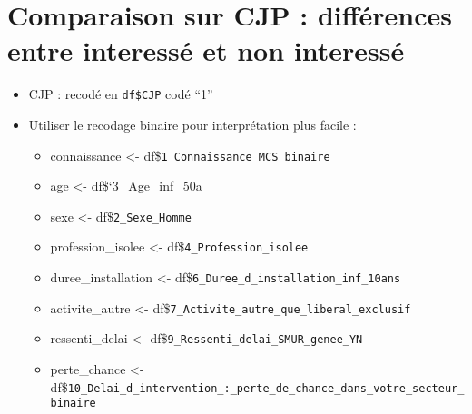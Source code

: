 \documentclass[
]{article}
\begin{document}
\section{Comparaison sur CJP : différences entre interessé et non
interessé}\label{comparaison-sur-cjp-diffuxe9rences-entre-interessuxe9-et-non-interessuxe9}

\begin{itemize}
\item
  CJP : recodé en \texttt{df\$CJP} codé ``1''
\item
  Utiliser le recodage binaire pour interprétation plus facile :

  \begin{itemize}
  \item
    connaissance \textless- df\$\texttt{1\_Connaissance\_MCS\_binaire}
  \item
    age \textless- df\$`3\_Age\_inf\_50a
  \item
    sexe \textless- df\$\texttt{2\_Sexe\_Homme}
  \item
    profession\_isolee \textless- df\$\texttt{4\_Profession\_isolee}
  \item
    duree\_installation \textless-
    df\$\texttt{6\_Duree\_d\_installation\_inf\_10ans}
  \item
    activite\_autre \textless-
    df\$\texttt{7\_Activite\_autre\_que\_liberal\_exclusif}
  \item
    ressenti\_delai \textless-
    df\$\texttt{9\_Ressenti\_delai\_SMUR\_genee\_YN}
  \item
    perte\_chance \textless-
    df\$\texttt{10\_Delai\_d\_intervention\_:\_perte\_de\_chance\_dans\_votre\_secteur\_binaire}
  \end{itemize}
\end{itemize}
\end{document}
